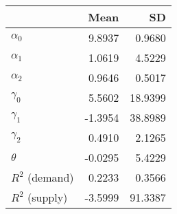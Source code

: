 
\begin{tabular}[t]{lrr}
\toprule
  & Mean & SD\\
\midrule
$\alpha_{0}$ & 9.8937 & 0.9680\\
$\alpha_{1}$ & 1.0619 & 4.5229\\
$\alpha_{2}$ & 0.9646 & 0.5017\\
$\gamma_{0}$ & 5.5602 & 18.9399\\
$\gamma_{1}$ & -1.3954 & 38.8989\\
$\gamma_{2}$ & 0.4910 & 2.1265\\
$\theta$ & -0.0295 & 5.4229\\
$R^{2}$ (demand) & 0.2233 & 0.3566\\
$R^{2}$ (supply) & -3.5999 & 91.3387\\
\bottomrule
\end{tabular}
